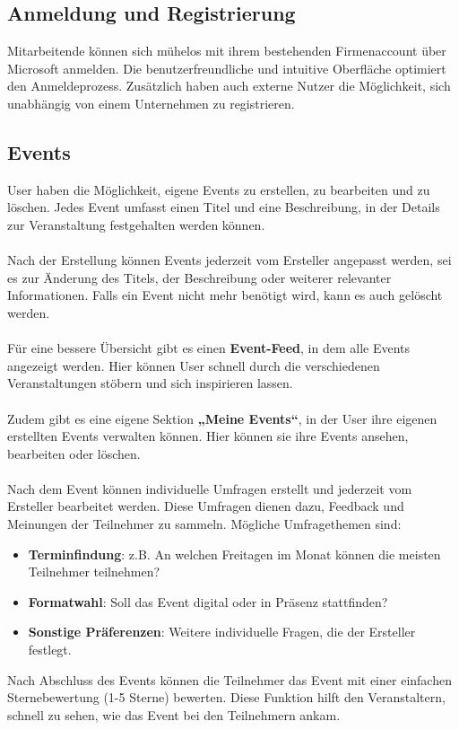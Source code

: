 \documentclass[a4paper,12pt]{article}
\begin{document}
\subsection{Anmeldung und Registrierung}
 Mitarbeitende können sich mühelos mit ihrem bestehenden Firmenaccount über Microsoft anmelden. Die benutzerfreundliche und intuitive Oberfläche optimiert den Anmeldeprozess. Zusätzlich haben auch externe Nutzer die Möglichkeit, sich unabhängig von einem Unternehmen zu registrieren.
\subsection{Events}
User haben die Möglichkeit, eigene Events zu erstellen, zu bearbeiten und zu löschen. Jedes Event umfasst einen Titel und eine Beschreibung, in der Details zur Veranstaltung festgehalten werden können.\\\\
Nach der Erstellung können Events jederzeit vom Ersteller angepasst werden, sei es zur Änderung des Titels, der Beschreibung oder weiterer relevanter Informationen. Falls ein Event nicht mehr benötigt wird, kann es auch gelöscht werden.\\\\
Für eine bessere Übersicht gibt es einen \textbf{Event-Feed}, in dem alle Events angezeigt werden. Hier können User schnell durch die verschiedenen Veranstaltungen stöbern und sich inspirieren lassen.\\\\
Zudem gibt es eine eigene Sektion \textbf{„Meine Events“}, in der User ihre eigenen erstellten Events verwalten können. Hier können sie ihre Events ansehen, bearbeiten oder löschen.\\\\
Nach dem Event können individuelle Umfragen erstellt und jederzeit vom Ersteller bearbeitet werden. Diese Umfragen dienen dazu, Feedback und Meinungen der Teilnehmer zu sammeln. Mögliche Umfragethemen sind:
\begin{itemize}
    \item \textbf{Terminfindung}: z.B. An welchen Freitagen im Monat können die meisten Teilnehmer teilnehmen?
    \item \textbf{Formatwahl}: Soll das Event digital oder in Präsenz stattfinden?
    \item \textbf{Sonstige Präferenzen}: Weitere individuelle Fragen, die der Ersteller festlegt.
\end{itemize}
Nach Abschluss des Events können die Teilnehmer das Event mit einer einfachen Sternebewertung (1-5 Sterne) bewerten. Diese Funktion hilft den Veranstaltern, schnell zu sehen, wie das Event bei den Teilnehmern ankam.
\newpage
\end{document}
